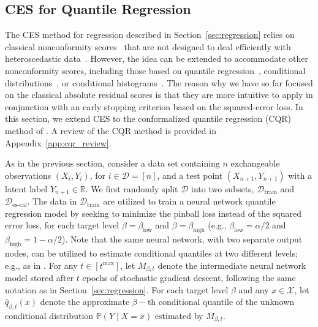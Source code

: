\subsection{CES for Quantile Regression} \label{sec:regression-cqr}

The CES method for regression described in Section~\ref{sec:regression} relies on classical nonconformity scores~\citep{vovk2005algorithmic,lei2016RegressionPS} that are not designed to deal efficiently with heteroscedastic data~\citep{romano2019conformalized,sesia2020comparison}.
However, the idea can be extended to accommodate other nonconformity scores, including those based on quantile regression~\citep{romano2019conformalized}, conditional distributions~\citep{izbicki2019flexible, chernozhukov2019distributional}, or conditional histograms~\citep{sesia2021conformal}.
The reason why we have so far focused on the classical absolute residual scores is that they are more intuitive to apply in conjunction with an early stopping criterion based on the squared-error loss. In this section, we extend CES to the conformalized quantile regression (CQR) method of \citet{romano2019conformalized}. A review of the CQR method is provided in Appendix~\ref{app:cqr_review}.

As in the previous section, consider a data set containing $n$ exchangeable observations $(X_i,Y_i)$, for $i \in \mathcal{D} = [n]$, and a test point $(X_{n+1}, Y_{n+1})$ with a latent label $Y_{n+1} \in \mathbb{R}$. 
We first randomly split $\mathcal{D}$ into two subsets, $\mathcal{D}_{\text{train}}$ and $\mathcal{D}_{\text{es-cal}}$. The data in $\mathcal{D}_{\text{train}}$ are utilized to train a neural network quantile regression model \cite{taylor2000quantile} by seeking to minimize the pinball loss instead of the squared error loss, for each target level $\beta=\beta_{\text{low}}$ and $\beta=\beta_{\text{high}}$ (e.g., $\beta_{\text{low}} = \alpha/2$ and $\beta_{\text{high}}=1-\alpha/2$). Note that the same neural network, with two separate output nodes, can be utilized to estimate conditional quantiles at two different levels; e.g., as in \citet{romano2019conformalized}.
For any $t \in [t^{\text{max}}]$, let $M_{\beta, t}$ denote the intermediate neural network model stored after $t$ epochs of stochastic gradient descent, following the same notation as in Section~\ref{sec:regression}.
For each target level $\beta$ and any $x \in \mathcal{X}$, let $\hat{q}_{\beta, t}(x)$ denote the approximate $\beta-$th conditional quantile of the unknown conditional distribution $\mathbb{P}(Y \mid X=x)$ estimated by $M_{\beta, t}$.



